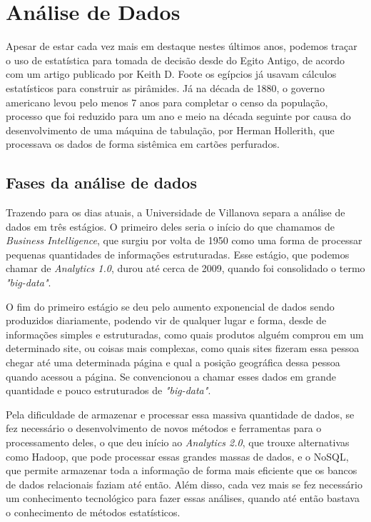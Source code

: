 \section{Análise de Dados}

\indent
\par Apesar de estar cada vez mais em destaque nestes últimos anos, podemos traçar o uso de estatística para tomada de decisão desde do Egito Antigo, de acordo com um artigo publicado por Keith D. Foote \cite{Foote2018} os egípcios já usavam cálculos estatísticos para construir as pirâmides. Já na década de 1880, o governo americano levou pelo menos 7 anos para completar o censo da população, processo que foi reduzido para um ano e meio na década seguinte por causa do desenvolvimento de uma máquina de tabulação, por Herman Hollerith, que processava os dados de forma sistêmica em cartões perfurados.

\subsection{Fases da análise de dados}

\indent
\par Trazendo para os dias atuais, a Universidade de Villanova separa a análise de dados em três estágios. O primeiro deles seria o início do que chamamos de \textit{Business Intelligence}, que surgiu por volta de 1950 como uma forma de processar pequenas quantidades de informações estruturadas. Esse estágio, que podemos chamar de \textit{Analytics 1.0}, durou até cerca de 2009, quando foi consolidado o termo \textit{"big-data"}.

\par O fim do primeiro estágio se deu pelo aumento exponencial de dados sendo produzidos diariamente, podendo vir de qualquer lugar e forma, desde de informações simples e estruturadas, como quais produtos alguém comprou em um determinado site, ou coisas mais complexas, como quais sites fizeram essa pessoa chegar até uma determinada página e qual a posição geográfica dessa pessoa quando acessou a página. Se convencionou a chamar esses dados em grande quantidade e pouco estruturados de \textit{"big-data"}.

\indent
\par Pela dificuldade de armazenar e processar essa massiva quantidade de dados, se fez necessário o desenvolvimento de novos métodos e ferramentas para o processamento deles, o que deu início ao \textit{Analytics 2.0}, que trouxe alternativas como Hadoop, que pode processar essas grandes massas de dados, e o NoSQL, que permite armazenar toda a informação de forma mais eficiente que os bancos de dados relacionais faziam até então. Além disso, cada vez mais se fez necessário um conhecimento tecnológico para fazer essas análises, quando até então bastava o conhecimento de métodos estatísticos.

